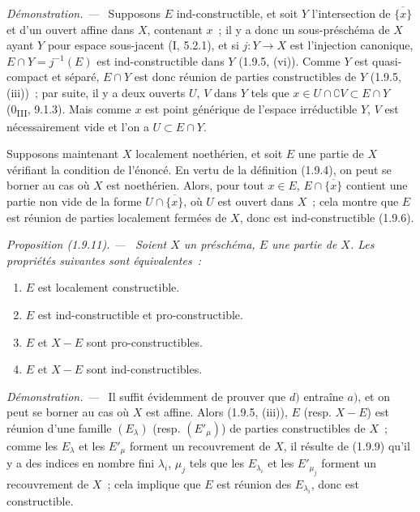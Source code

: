 \documentclass[10pt,oneside]{book}
\makeatletter
\newcommand{\setmanualcurrentlabel}[1]{\def\@currentlabel{#1}}
\newenvironment{proposition}[1][]{%
  \setmanualcurrentlabel{#1}\par\medskip\noindent\itshape Proposition (#1). ---\ }{\par}
\newenvironment{proof}{%
  \par\medskip\noindent\textit{Démonstration. ---\ }}{\par}
\makeatother
\begin{document}
\begin{proof}
Supposons $E$ ind-constructible, et soit $Y$ l'intersection de
$\overline{\{x\}}$ et d'un ouvert affine dans $X$, contenant $x$~; il y a
donc un sous-préschéma de $X$ ayant $Y$ pour espace sous-jacent (I, 5.2.1),
et si $j:Y\to X$ est l'injection canonique,
$E\cap Y=j^{-1}(E)$ est ind-constructible dans $Y$ (1.9.5, (vi)). Comme $Y$
est quasi-compact et séparé, $E\cap Y$ est donc réunion de parties
constructibles de $Y$ (1.9.5, (iii))~; par suite, il y a deux ouverts $U$,
$V$ dans $Y$ tels que
$x\in U\cap\complement V\subset E\cap Y$ (0\textsubscript{III}, 9.1.3).
Mais comme $x$ est point générique de l'espace irréductible $Y$, $V$ est
nécessairement vide et l'on a $U\subset E\cap Y$.

Supposons maintenant $X$ localement noethérien, et soit $E$ une partie de
$X$ vérifiant la condition de l'énoncé. En vertu de la définition (1.9.4),
on peut se borner au cas où $X$ est noethérien. Alors, pour tout $x\in E$,
$E\cap\overline{\{x\}}$ contient une partie non vide de la forme
$U\cap\overline{\{x\}}$, où $U$ est ouvert dans $X$~; cela montre que $E$
est réunion de parties localement fermées de $X$, donc est
ind-constructible (1.9.6).
\end{proof}

\begin{proposition}[1.9.11]
\label{IV.1.9.11-fr}
Soient $X$ un préschéma, $E$ une partie de $X$. Les propriétés suivantes sont
équivalentes~:
\begin{enumerate}
  \item[a)] $E$ est localement constructible.
  \item[b)] $E$ est ind-constructible et pro-constructible.
  \item[c)] $E$ et $X-E$ sont pro-constructibles.
  \item[d)] $E$ et $X-E$ sont ind-constructibles.
\end{enumerate}
\end{proposition}

\begin{proof}
Il suffit évidemment de prouver que $d)$ entraîne $a)$, et on peut se borner
au cas où $X$ est affine. Alors (1.9.5, (iii)), $E$ (resp. $X-E$) est réunion
d'une famille $(E_\lambda)$ (resp. $(E'_\mu)$) de parties constructibles de
$X$~; comme les $E_\lambda$ et les $E'_\mu$ forment un recouvrement de $X$,
il résulte de (1.9.9) qu'il y a des indices en nombre fini $\lambda_i$,
$\mu_j$ tels que les $E_{\lambda_i}$ et les $E'_{\mu_j}$ forment un
recouvrement de $X$~; cela implique que $E$ est réunion des
$E_{\lambda_i}$, donc est constructible.
\end{proof}
\end{document}
